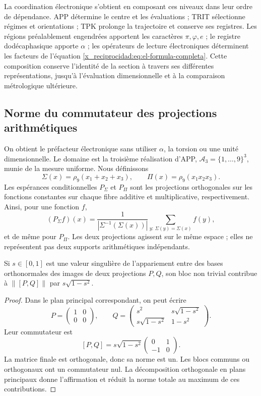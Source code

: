 La coordination électronique s'obtient en composant ces niveaux dans leur
ordre de dépendance. APP détermine le centre et les évaluations ;
TRIT sélectionne régimes et orientations ; TPK prolonge la trajectoire
et conserve ses registres. Les régions préalablement engendrées apportent
les caractères \(\pi,\varphi,e\) ; le registre dodécaphasique apporte
\(\alpha\) ; les opérateurs de lecture électroniques déterminent les facteurs de
l'équation \eqref{x_reciprocidad:eq:el-formula-completa}. Cette composition conserve
l'identité de la section à travers ses différentes
représentations, jusqu'à l'évaluation dimensionnelle et à la comparaison
métrologique ultérieure.



\subsection{Norme du commutateur des projections arithmétiques}

On obtient le préfacteur électronique sans utiliser \(\alpha\), la torsion ou une unité dimensionnelle. Le domaine est la troisième réalisation d'APP, \(\mathcal A_3=\{1,\ldots,9\}^3\), munie de la mesure uniforme. Nous définissons
\[
 \Sigma(x)=\rho_9(x_1+x_2+x_3),\qquad
 \Pi(x)=\rho_9(x_1x_2x_3).
\]
Les espérances conditionnelles \(P_\Sigma\) et \(P_\Pi\) sont les
projections orthogonales sur les fonctions constantes sur chaque fibre
additive et multiplicative, respectivement. Ainsi, pour une fonction \(f\),
\[
 (P_\Sigma f)(x)
 =\frac{1}{|\Sigma^{-1}(\Sigma(x))|}
   \sum_{y:\,\Sigma(y)=\Sigma(x)}f(y),
\]
et de même pour \(P_\Pi\). Les deux projections agissent sur le même espace ; elles ne représentent pas deux supports arithmétiques indépendants.

\begin{lemma}
Si \(s\in[0,1]\) est une valeur singulière de l'appariement entre des bases
orthonormales des images de deux projections \(P,Q\), son bloc non
trivial contribue à \(\|[P,Q]\|\) par
\(s\sqrt{1-s^2}\).
\end{lemma}
\begin{proof}
Dans le plan principal correspondant, on peut écrire
\[
 P=\begin{pmatrix}1&0\\0&0\end{pmatrix},\qquad
 Q=\begin{pmatrix}
 s^2&s\sqrt{1-s^2}\\
 s\sqrt{1-s^2}&1-s^2
 \end{pmatrix}.
\]
Leur commutateur est
\[
 [P,Q]=s\sqrt{1-s^2}
 \begin{pmatrix}0&1\\-1&0\end{pmatrix}.
\]
La matrice finale est orthogonale, donc sa norme est un. Les blocs communs ou orthogonaux ont un commutateur nul. La décomposition orthogonale en plans principaux donne l'affirmation et réduit la norme totale au maximum de ces contributions.
\end{proof}

